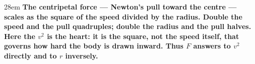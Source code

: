 \documentclass[border=4pt]{standalone}
\begin{document}
\begin{varwidth}{28em}
\large\bfseries
The \textcolor{force}{centripetal force} — Newton's \textcolor{force}{pull toward the centre} — scales as the \textcolor{speed}{square of the speed} divided by the \textcolor{radius}{radius}. Double the \textcolor{speed}{speed} and the \textcolor{force}{pull} quadruples; double the \textcolor{radius}{radius} and the \textcolor{force}{pull} halves. Here the \textcolor{speed}{$v^2$} is the heart: it is the \textcolor{speed}{square}, not the speed itself, that governs how hard the body is drawn inward. Thus \textcolor{force}{$F$} answers to \textcolor{speed}{$v^2$} directly and to \textcolor{radius}{$r$} inversely.
\end{varwidth}
\end{document}
